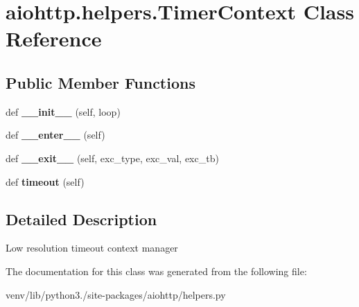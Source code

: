 \hypertarget{classaiohttp_1_1helpers_1_1_timer_context}{}\section{aiohttp.\+helpers.\+Timer\+Context Class Reference}
\label{classaiohttp_1_1helpers_1_1_timer_context}
\subsection*{Public Member Functions}
\begin{DoxyCompactItemize}
\item 
\mbox{\label{classaiohttp_1_1helpers_1_1_timer_context_adb513c026449a6a5f502ec1a82729e7b}} 
def {\bfseries \+\_\+\+\_\+init\+\_\+\+\_\+} (self, loop)
\item 
\mbox{\label{classaiohttp_1_1helpers_1_1_timer_context_add8c0586e5e333f6d1c4d0cb09c9dc2d}} 
def {\bfseries \+\_\+\+\_\+enter\+\_\+\+\_\+} (self)
\item 
\mbox{\label{classaiohttp_1_1helpers_1_1_timer_context_a40757b67b6dc3883c7ed6ca373f984dc}} 
def {\bfseries \+\_\+\+\_\+exit\+\_\+\+\_\+} (self, exc\+\_\+type, exc\+\_\+val, exc\+\_\+tb)
\item 
\mbox{\label{classaiohttp_1_1helpers_1_1_timer_context_a225b0e118c19a793ee1efd51d7cb1f27}} 
def {\bfseries timeout} (self)
\end{DoxyCompactItemize}


\subsection{Detailed Description}
\begin{DoxyVerb}Low resolution timeout context manager \end{DoxyVerb}
 

The documentation for this class was generated from the following file\+:\begin{DoxyCompactItemize}
\item 
venv/lib/python3./site-\/packages/aiohttp/helpers.\+py\end{DoxyCompactItemize}
